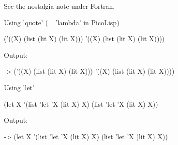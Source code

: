 See the nostalgia note under Fortran.


\begin{wideverbatim}

Using 'quote' (= 'lambda' in PicoLisp)

('((X) (list (lit X) (lit X))) '((X) (list (lit X) (lit X))))

Output:

-> ('((X) (list (lit X) (lit X))) '((X) (list (lit X) (lit X))))

Using 'let'

(let X '(list 'let 'X (lit X) X) (list 'let 'X (lit X) X))

Output:

-> (let X '(list 'let 'X (lit X) X) (list 'let 'X (lit X) X))

\end{wideverbatim}



% 
